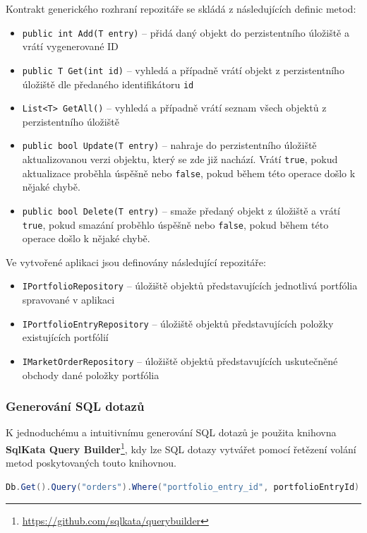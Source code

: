 \documentclass[12pt, a4paper]{article}
\begin{document}
    Kontrakt generického rozhraní repozitáře se skládá z následujících definic metod:
    \begin{itemize}
        \item \texttt{public int Add(T entry)} -- přidá daný objekt do perzistentního úložiště a vrátí vygenerované ID
        \item \texttt{public T Get(int id)} -- vyhledá a případně vrátí objekt z perzistentního úložiště dle předaného identifikátoru \texttt{id}
        \item \texttt{List<T> GetAll()} -- vyhledá a případně vrátí seznam všech objektů z perzistentního úložiště
        \item \texttt{public bool Update(T entry)} -- nahraje do perzistentního úložiště aktualizovanou verzi objektu, který se zde již nachází. Vrátí \texttt{true}, pokud aktualizace proběhla úspěšně nebo \texttt{false}, pokud během této operace došlo k nějaké chybě.
        \item \texttt{public bool Delete(T entry)} -- smaže předaný objekt z úložiště a vrátí \texttt{true}, pokud smazání proběhlo úspěšně nebo \texttt{false}, pokud během této operace došlo k nějaké chybě.

    \end{itemize}

    \noindent Ve vytvořené aplikaci jsou definovány následující repozitáře:
    \begin{itemize}
        \item \texttt{IPortfolioRepository} -- úložiště objektů představujících jednotlivá portfólia spravované v aplikaci
        \item \texttt{IPortfolioEntryRepository} -- úložiště objektů představujících položky existujících portfólií
        \item \texttt{IMarketOrderRepository} -- úložiště objektů představujících uskutečněné obchody dané položky portfólia
    \end{itemize}

    \subsubsection{Generování SQL dotazů}
    K jednoduchému a intuitivnímu generování SQL dotazů je použita knihovna \textbf{SqlKata Query Builder}\footnote{\url{https://github.com/sqlkata/querybuilder}}, kdy lze SQL dotazy vytvářet pomocí řetězení volání metod poskytovaných touto knihovnou.

    \begin{lstlisting}[language=Java, caption={Příklad generování SQL dotazu pro výběr všech transakcí dané položky portfólia pomocí knihovny SqlKata Query Builder.},captionpos=b, label={lst:sm-showcase}]
Db.Get().Query("orders").Where("portfolio_entry_id", portfolioEntryId).Get()
    \end{lstlisting}
\end{document}
